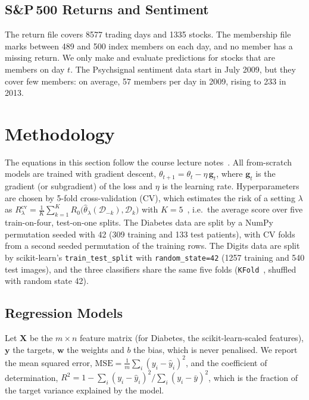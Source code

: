 \documentclass[conference]{IEEEtran}
\newcommand{\vect}[1]{\mathbf{#1}}
\begin{document}
\subsection{\texorpdfstring{S\&P\,500 Returns and Sentiment}{S\&P 500 Returns and Sentiment}}
\label{sec:spdata}
The return file covers 8577 trading days and 1335 stocks. The membership file marks between 489 and 500 index members on each day, and no member has a missing return. We only make and evaluate predictions for stocks that are members on day $t$. The Psychsignal sentiment data start in July 2009, but they cover few members: on average, 57 members per day in 2009, rising to 233 in 2013.

\section{Methodology}
\label{sec:method}
The equations in this section follow the course lecture notes~\cite{notes}. All from-scratch models are trained with gradient descent, $\theta_{t+1}=\theta_t-\eta\,\vect{g}_t$, where $\vect{g}_t$ is the gradient (or subgradient) of the loss and $\eta$ is the learning rate. Hyperparameters are chosen by 5-fold cross-validation (CV), which estimates the risk of a setting $\lambda$ as $R^{\mathrm{cv}}_\lambda=\frac{1}{K}\sum_{k=1}^{K}R_0\big(\hat\theta_\lambda(\mathcal{D}_{-k}),\mathcal{D}_k\big)$ with $K=5$~\cite{notes}, i.e.\ the average score over five train-on-four, test-on-one splits. The Diabetes data are split by a NumPy permutation seeded with 42 (309 training and 133 test patients), with CV folds from a second seeded permutation of the training rows. The Digits data are split by scikit-learn's \texttt{train\_test\_split} with \texttt{random\_state=42} (1257 training and 540 test images), and the three classifiers share the same five folds (\texttt{KFold}~\cite{skAPI}, shuffled with random state 42).

\subsection{Regression Models}
Let $\vect{X}$ be the $m\times n$ feature matrix (for Diabetes, the scikit-learn-scaled features), $\vect{y}$ the targets, $\vect{w}$ the weights and $b$ the bias, which is never penalised. We report the mean squared error, $\mathrm{MSE}=\frac{1}{m}\sum_i(y_i-\hat y_i)^2$, and the coefficient of determination, $R^2=1-\sum_i(y_i-\hat y_i)^2/\sum_i(y_i-\bar y)^2$, which is the fraction of the target variance explained by the model.
\end{document}
